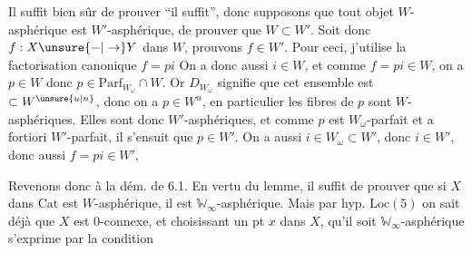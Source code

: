 Il suffit bien sûr de prouver ``il suffit'', donc supposons que tout objet $W$-asphérique est $W'$-asphérique, de prouver que $W\subset W'$. Soit donc $f:X\unsure{\mathbin{-}|\to}Y$ dans $W$, prouvons $f\in W'$. Pour ceci, j'utilise la factorisation canonique $f=pi$
On a donc aussi $i\in W$, et comme $f=pi\in W$, on a $p\in W$ donc $p\in\mathrm{Parf}_{W_\omega}\cap W$. Or $D_{W_\omega}$ signifie que cet ensemble est $\subset W^{\unsure{u|n}}$, donc on a $p\in W^u$,  en particulier les fibres de $p$ sont $W$-asphériques. Elles sont donc $W'$-asphériques, et comme $p$ est $W_\omega$-parfait et a fortiori $W'$-parfait, il s'ensuit que $p\in W'$. On a aussi $i\in W_\omega\subset W'$, donc $i\in W'$, donc aussi $f=pi\in W'$, 

Revenons donc à la dém. de 6.1. En vertu du lemme, il suffit de prouver que si $X$ dans $\mathrm{Cat}$ est $W$-asphérique, il est $\mathbb W_\infty$-asphérique. Mais par hyp. $\mathrm{Loc}(5)$ on sait déjà que $X$ est $0$-connexe, et choisissant un pt $x$ dans $X$, qu'il soit $\mathbb W_\infty$-asphérique s'exprime par la condition

